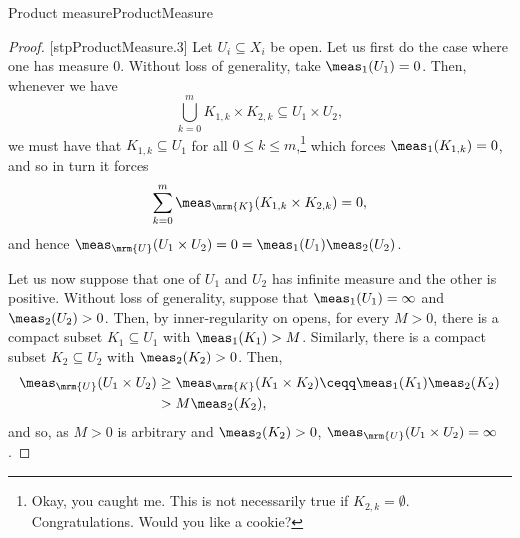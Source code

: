 \begin{thm}{Product measure}{ProductMeasure}
\begin{proof}
[stpProductMeasure.3]
Let $U_i\subseteq X_i$ be open.  Let us first do the case where one has measure $0$.  Without loss of generality, take $\meas _1(U_1)=0$.  Then, whenever we have
\begin{equation}
\bigcup _{k=0}^mK_{1,k}\times K_{2,k}\subseteq U_1\times U_2,
\end{equation}
we must have that $K_{1,k}\subseteq U_1$ for all $0\leq k\leq m$,\footnote{Okay, you caught me.  This is not necessarily true if $K_{2,k}=\emptyset$.  Congratulations.  Would you like a cookie?} which forces $\meas _1(K_{1,k})=0$, and so in turn it forces
\begin{equation}
\sum _{k=0}^m\meas _{\mrm{K}}(K_{1,k}\times K_{2,k})=0,
\end{equation}
and hence $\meas _{\mrm{U}}(U_1\times U_2)=0=\meas _1(U_1)\meas _2(U_2)$.

Let us now suppose that one of $U_1$ and $U_2$ has infinite measure and the other is positive.  Without loss of generality, suppose that $\meas _1(U_1)=\infty$ and $\meas _2(U_2)>0$.  Then, by inner-regularity on opens, for every $M>0$, there is a compact subset $K_1\subseteq U_1$ with $\meas _1(K_1)>M$.  Similarly, there is a compact subset $K_2\subseteq U_2$ with $\meas _2(K_2)>0$.  Then,
\begin{equation}
\begin{split}
\meas _{\mrm{U}}(U_1\times U_2) & \geq \meas _{\mrm{K}}(K_1\times K_2)\ceqq \meas _1(K_1)\meas _2(K_2) \\
& >M\meas _2(K_2),
\end{split}
\end{equation}
and so, as $M>0$ is arbitrary and $\meas _2(K_2)>0$, $\meas _{\mrm{U}}(U_1\times U_2)=\infty$.


\end{proof}
\end{thm}
